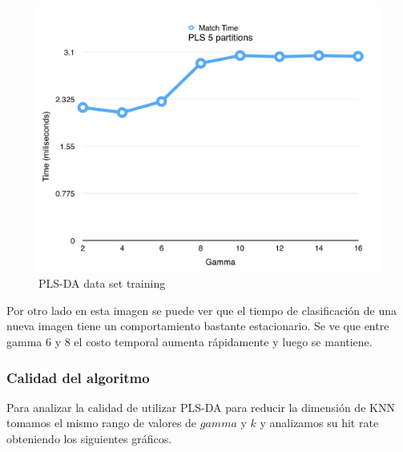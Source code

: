 \begin{figure}[h!]
  \begin{center}
	\includegraphics[scale=0.7]{exp2/PLS-Match-Time.png}
	\caption{PLS-DA data set training}
  \end{center}
\end{figure}

Por otro lado en esta imagen se puede ver que el tiempo de clasificación de una nueva imagen tiene un comportamiento bastante estacionario. Se ve que entre gamma 6 y 8 el costo temporal aumenta rápidamente y luego se mantiene.
\newpage
\subsubsection*{Calidad del algoritmo}

Para analizar la calidad de utilizar PLS-DA para reducir la dimensión de KNN tomamos el mismo rango de valores de $gamma$ y $k$ y analizamos su hit rate obteniendo los siguientes gráficos.

